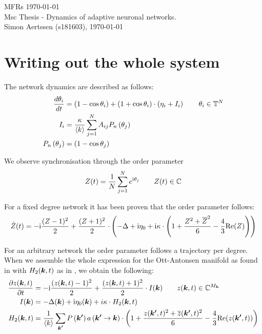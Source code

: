 


\mainmatter

MFRs \today \\
Msc Thesis - Dynamics of adaptive neuronal networks. \\
Simon Aertssen (s181603), \today \\ 

\section{Writing out the whole system}
The network dynamics are described as follows:
\begin{align}
\frac{d \theta_i}{d t} &= (1 - \cos\theta_i) + (1 + \cos\theta_i)\cdot\left(\eta_i + I_i \right) \qquad \theta_i \in {\mathbb{T}}^N \nonumber \\
I_{i} &= \frac{\kappa}{\langle k\rangle} \sum_{j=1}^{N} A_{i j} P_{n}\left(\theta_{j}\right) \label{eq:FullThetaNeuronNetwork} \\
P_{n}\left(\theta_{j}\right) &= (1 - \cos\theta_j) \nonumber
\end{align}

We observe synchronisation through the order parameter
\begin{align}
Z(t) = \frac{1}{N} \sum_{j=1}^N e^{{\rm{i}}\theta_j}  \qquad Z(t) \in {\mathbb{C}} \label{eq:orderparameter}
\end{align}

For a fixed degree network it has been proven that the order parameter follows:
\begin{align}
\dot{Z}(t)= -{\rm{i}} \frac{(Z-1)^2}{2}+\frac{(Z+1)^2}{2} \cdot \left(-\Delta+ {\rm{i}}\eta_{0}
+ {\rm{i}} \kappa \cdot \left(1+\frac{Z^{2} + \overline{Z}^{2} }{6} - \frac{4}{3} {\operatorname{Re}}(Z)\right)\right) \label{eq:MeanField}
\end{align}
    
For an arbitrary network the order parameter follows a trajectory per degree. When we assemble the whole expression for the Ott-Antonsen manifold as found in \cite{OttAntonsen2017} with $H_2({\boldsymbol{k}},t)$ as in \cite{Martens2020}, we obtain the following:
\begin{align}
\frac{\partial z({\boldsymbol{k}}, t)}{\partial t} &= -{\rm{i}} \frac{(z({\boldsymbol{k}}, t)-1)^{2}}{2} + \frac{(z({\boldsymbol{k}}, t)+1)^{2}}{2} \cdot I({\boldsymbol{k}}) \qquad z({\boldsymbol{k}},t) \in {\mathbb{C}}^{M_{\boldsymbol{k}}} \nonumber \\
I({\boldsymbol{k}}) &= -\Delta({\boldsymbol{k}}) + {\rm{i}} \eta_{0}({\boldsymbol{k}}) + i \kappa \cdot H_2({\boldsymbol{k}},t) \label{eq:OttAntonsenSystemFull} \\
H_2({\boldsymbol{k}},t) &= \frac{1}{{\langle k\rangle}} \sum_{{\boldsymbol{k'}}} P\left({\boldsymbol{k'}}\right) a\left({\boldsymbol{k'}} \rightarrow {\boldsymbol{k}}\right) \cdot \left( 1 + \frac{z({\boldsymbol{k'}}, t)^2 + \overline{z}({\boldsymbol{k'}}, t)^2}{6} - \frac{4}{3} {\operatorname{Re}}(z({\boldsymbol{k'}}, t)) \right) \nonumber
\end{align}

